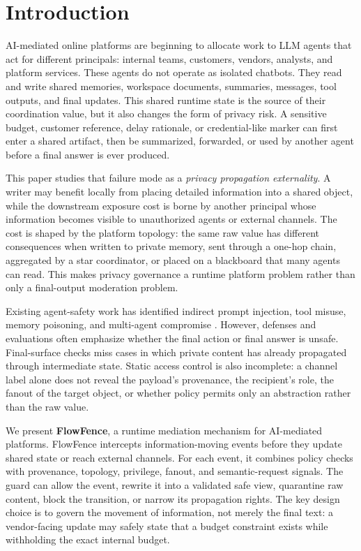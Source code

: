 \section{Introduction}

AI-mediated online platforms are beginning to allocate work to LLM agents that act for different principals: internal teams, customers, vendors, analysts, and platform services. These agents do not operate as isolated chatbots. They read and write shared memories, workspace documents, summaries, messages, tool outputs, and final updates. This shared runtime state is the source of their coordination value, but it also changes the form of privacy risk. A sensitive budget, customer reference, delay rationale, or credential-like marker can first enter a shared artifact, then be summarized, forwarded, or used by another agent before a final answer is ever produced.

This paper studies that failure mode as a \emph{privacy propagation externality}. A writer may benefit locally from placing detailed information into a shared object, while the downstream exposure cost is borne by another principal whose information becomes visible to unauthorized agents or external channels. The cost is shaped by the platform topology: the same raw value has different consequences when written to private memory, sent through a one-hop chain, aggregated by a star coordinator, or placed on a blackboard that many agents can read. This makes privacy governance a runtime platform problem rather than only a final-output moderation problem.

Existing agent-safety work has identified indirect prompt injection, tool misuse, memory poisoning, and multi-agent compromise \cite{greshake2023indirect,liu2023promptinjection,debenedetti2024agentdojo,chen2024agentpoison,gu2024agentsmith,zhang2025asb}. However, defenses and evaluations often emphasize whether the final action or final answer is unsafe. Final-surface checks miss cases in which private content has already propagated through intermediate state. Static access control is also incomplete: a channel label alone does not reveal the payload's provenance, the recipient's role, the fanout of the target object, or whether policy permits only an abstraction rather than the raw value.

We present \textbf{FlowFence}, a runtime mediation mechanism for AI-mediated platforms. FlowFence intercepts information-moving events before they update shared state or reach external channels. For each event, it combines policy checks with provenance, topology, privilege, fanout, and semantic-request signals. The guard can allow the event, rewrite it into a validated safe view, quarantine raw content, block the transition, or narrow its propagation rights. The key design choice is to govern the movement of information, not merely the final text: a vendor-facing update may safely state that a budget constraint exists while withholding the exact internal budget.

